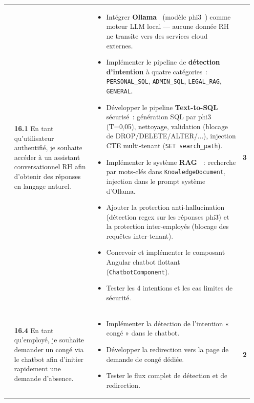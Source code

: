 \begin{small}
\begin{longtable}{|p{2.8cm}|p{6.2cm}|p{6.2cm}|c|}
& \textbf{16.1} En tant qu'utilisateur authentifié, je souhaite accéder à un assistant conversationnel RH afin d'obtenir des réponses en langage naturel.
& \begin{itemize}[leftmargin=*, noitemsep, topsep=0pt]
    \item Intégrer \textbf{Ollama}~\cite{ollama} (modèle phi3~\cite{phi3}) comme moteur LLM local --- aucune donnée RH ne transite vers des services cloud externes.
    \item Implémenter le pipeline de \textbf{détection d'intention} à quatre catégories~: \texttt{PERSONAL\_SQL}, \texttt{ADMIN\_SQL}, \texttt{LEGAL\_RAG}, \texttt{GENERAL}.
    \item Développer le pipeline \textbf{Text-to-SQL} sécurisé~: génération SQL par phi3 (T=0,05), nettoyage, validation (blocage de DROP/DELETE/ALTER/...), injection CTE multi-tenant (\texttt{SET search\_path}).
    \item Implémenter le système \textbf{RAG}~\cite{rag}~: recherche par mots-clés dans \texttt{KnowledgeDocument}, injection dans le prompt système d'Ollama.
    \item Ajouter la protection anti-hallucination (détection regex sur les réponses phi3) et la protection inter-employés (blocage des requêtes inter-tenant).
    \item Concevoir et implémenter le composant Angular chatbot flottant (\texttt{ChatbotComponent}).
    \item Tester les 4 intentions et les cas limites de sécurité.
  \end{itemize}
& \textbf{3} \\ 

& \textbf{16.4} En tant qu'employé, je souhaite demander un congé via le chatbot afin d'initier rapidement une demande d'absence.
& \begin{itemize}[leftmargin=*, noitemsep, topsep=0pt]
    \item Implémenter la détection de l'intention « congé » dans le chatbot.
    \item Développer la redirection vers la page de demande de congé dédiée.
    \item Tester le flux complet de détection et de redirection.
  \end{itemize}
& \textbf{2} \\ 


\end{longtable}
\end{small}
